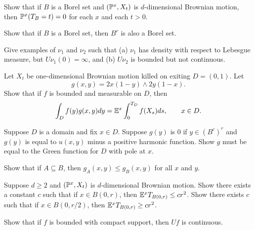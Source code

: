 \begin{exercise}\label{ex:ch2_11}
Show that if $B$ is a Borel set and $(\P^x, X_t)$ is $d$-dimensional Brownian motion, then $\P^x(T_B = t) = 0$ for each $x$ and each $t > 0$.
\end{exercise}

\begin{exercise}\label{ex:ch2_12}
Show that if $B$ is a Borel set, then $B^r$ is also a Borel set.
\end{exercise}

\begin{exercise}\label{ex:ch2_13}
Give examples of $\nu_1$ and $\nu_2$ such that (a) $\nu_1$ has density with respect to Lebesgue measure, but $U\nu_1(0) = \infty$, and (b) $U\nu_2$ is bounded but not continuous.
\end{exercise}

\mpagebreak

\begin{exercise}\label{ex:ch2_14}
Let $X_t$ be one-dimensional Brownian motion killed on exiting $D = (0,1)$. Let
\[
    g(x,y) = 2x(1-y) \wedge 2y(1-x).
\]
Show that if $f$ is bounded and measurable on $D$, then
\[
    \int_D f(y)g(x,y)dy = \E^x \int_0^{T_D} f(X_s)ds, \qquad x \in D.
\]
\end{exercise}

\begin{exercise}\label{ex:ch2_15}
Suppose $D$ is a domain and fix $x \in D$. Suppose $g(y)$ is $0$ if $y \in (B^c)^r$ and $g(y)$ is equal to $u(x,y)$ minus a positive harmonic function. Show $g$ must be equal to the Green function for $D$ with pole at $x$.
\end{exercise}

\begin{exercise}\label{ex:ch2_16}
Show that if $A \subseteq B$, then $g_A(x,y) \leq g_B(x,y)$ for all $x$ and $y$.
\end{exercise}

\begin{exercise}\label{ex:ch2_17}
Suppose $d \geq 2$ and $(\P^x, X_t)$ is $d$-dimensional Brownian motion. Show there exists a constant $c$ such that if $x \in B(0,r)$, then $\E^xT_{B(0,r)} \leq cr^2$. Show there exists $c$ such that if $x \in B(0,r/2)$, then $\E^xT_{B(0,r)} \geq cr^2$.
\end{exercise}

\begin{exercise}\label{ex:ch2_18}
Show that if $f$ is bounded with compact support, then $Uf$ is continuous.
\end{exercise}

